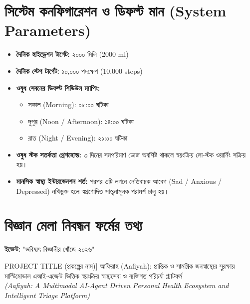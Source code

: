 \documentclass[12pt,a4paper,oneside]{report}
\begin{document}
\appendix
\chapter{সিস্টেম কনফিগারেশন ও ডিফল্ট মান (System Parameters)}
\begin{itemize}
    \item \textbf{দৈনিক হাইড্রেশন টার্গেট:} ২০০০ মিলি (2000 ml)
    \item \textbf{দৈনিক স্টেপ টার্গেট:} ১০,০০০ পদক্ষেপ (10,000 steps)
    \item \textbf{ওষুধ সেবনের ডিফল্ট শিডিউল ম্যাপিং:}
    \begin{itemize}
        \item সকাল (Morning): ০৮:০০ ঘটিকা
        \item দুপুর (Noon / Afternoon): ১৪:০০ ঘটিকা
        \item রাত (Night / Evening): ২১:০০ ঘটিকা
    \end{itemize}
    \item \textbf{ওষুধ স্টক সতর্কতা থ্রেশহোল্ড:} ৩ দিনের সমপরিমাণ ডোজ অবশিষ্ট থাকলে স্বয়ংক্রিয় লো-স্টক ওয়ার্নিং সক্রিয় হয়।
    \item \textbf{মানসিক স্বাস্থ্য ইন্টারভেনশন শর্ত:} পরপর ৩টি লগনে নেতিবাচক আবেগ (Sad / Anxious / Depressed) নথিভুক্ত হলে স্বপ্রণোদিত সান্ত্বনামূলক পরামর্শ চালু হয়।
\end{itemize}

\chapter{বিজ্ঞান মেলা নিবন্ধন ফর্মের তথ্য}
\textbf{ইভেন্ট:} "ভবিষ্যৎ বিজ্ঞানীর খোঁজে ২০২৬"

\begin{highlightbox}[title=[FIELD 1] PROJECT TITLE (প্রকল্পের নাম)]
আফিয়াহ (Aafiyah): প্রান্তিক ও সামগ্রিক জনস্বাস্থ্যের সুরক্ষায় মাল্টিমোডাল এআই-এজেন্ট ভিত্তিক স্বয়ংক্রিয় স্বাস্থ্যসেবা ও ব্যক্তিগত পরিচর্যা প্ল্যাটফর্ম\\
\textit{(Aafiyah: A Multimodal AI-Agent Driven Personal Health Ecosystem and Intelligent Triage Platform)}
\end{highlightbox}
\end{document}
